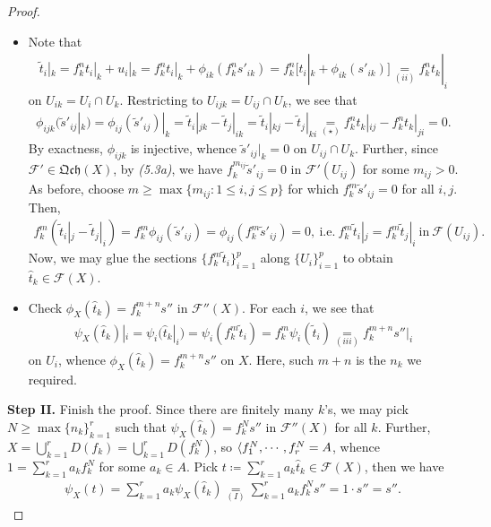 \documentclass[11pt,a4paper,footinclude=true,headinclude=true]{scrbook} %
\newcommand{\FF}{\mathscr{F}}
\newcommand{\<}{\langle}
\let\>\relax
\newcommand{\>}{\rangle}
\newcommand{\qcoh}{\mathfrak{Qch}}
\begin{document}
\begin{proof}
\begin{itemize}
        \item[(v)] Note that 
        \begin{align*}
            \tilde{t}_i|_k=f^n_kt_i|_k+u_i|_k=f^n_kt_i|_k+\phi_{ik}(f^n_ks'_{ik})=f^n_k[t_i|_k+\phi_{ik}(s'_{ik})]\underset{(ii)}{=}f^n_kt_k|_i\tag{$\star$}
        \end{align*}
        on $U_{ik}=U_i\cap U_k$. Restricting to $U_{ijk}=U_{ij}\cap U_k$, we see that 
        \begin{align*}
            \phi_{ijk}(\tilde{s}'_{ij}|_k)=\phi_{ij}(\tilde{s}'_{ij})|_k=\tilde{t}_i|_{jk}-\tilde{t}_j|_{ik}=\tilde{t}_i|_{kj}-\tilde{t}_j|_{ki}\underset{(\star)}{=}f^n_kt_k|_{ij}-f^n_kt_k|_{ji}=0.
        \end{align*}
        By exactness, $\phi_{ijk}$ is injective, whence $\tilde{s}'_{ij}|_k=0$ on $U_{ij}\cap U_k$. Further, since $\FF'\in\qcoh(X)$, by \textit{(5.3a)}, we have $f^{m_{ij}}_k\tilde{s}'_{ij}=0$ in $\FF'(U_{ij})$ for some $m_{ij}>0$. As before, choose $m\geq\max\{m_{ij}:1\leq i,j\leq p\}$ for which $f^m_k\tilde{s}'_{ij}=0$ for all $i,j$. Then, 
        \begin{align*}
            f^m_k(\tilde{t}_i|_j-\tilde{t}_j|_i)=f^m_k\phi_{ij}(\tilde{s}'_{ij})=\phi_{ij}(f^m_k\tilde{s}'_{ij})=0,\ \text{i.e.}\ f^m_k\tilde{t}_i|_j=f^m_k\tilde{t}_j|_i\ \text{in}\ \FF(U_{ij}).
        \end{align*}
        Now, we may glue the sections $\{f^m_k\tilde{t}_i\}_{i=1}^p$ along $\{U_i\}_{i=1}^p$ to obtain $\hat{t}_k\in\FF(X)$.
        \item[(vi)] Check $\phi_X(\hat{t}_k)=f^{m+n}_ks''$ in $\FF''(X)$. For each $i$, we see that
        \begin{align*}
            \psi_X(\hat{t}_k)|_i=\psi_i(\hat{t}_k|_i)=\psi_i(f^m_k\tilde{t}_i)=f^m_k\psi_i(\tilde{t}_i)\underset{(iii)}{=}f^{m+n}_ks''|_i
        \end{align*}
        on $U_i$, whence $\phi_X(\hat{t}_k)=f^{m+n}_ks''$ on $X$. Here, such $m+n$ is the $n_k$ we required.
    \end{itemize}
    \textbf{Step II.} Finish the proof. Since there are finitely many $k$'s, we may pick $N\geq\max\{n_k\}_{k=1}^r$ such that $\psi_X(\hat{t}_k)=f^N_ks''$ in $\FF''(X)$ for all $k$. Further, $X=\bigcup_{k=1}^rD(f_k)=\bigcup_{k=1}^rD(f^N_k)$, so $\<f^N_1,\cdots,f^N_r\>=A$, whence $1=\sum_{k=1}^ra_kf^N_k$ for some $a_k\in A$. Pick $t\coloneqq\sum_{k=1}^ra_k\hat{t}_k\in\FF(X)$, then we have
    \begin{align*}
        \psi_X(t)=\sum_{k=1}^ra_k\psi_X(\hat{t}_k)\underset{(I)}{=}\sum_{k=1}^ra_kf^N_ks''=1\cdot s''=s''.
    \end{align*}
\end{proof}
\end{document}
